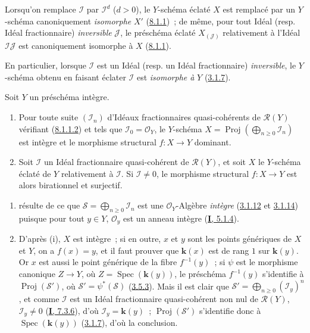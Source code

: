 Lorsqu'on remplace $\mathcal{I}$ par $\mathcal{I}^d$ ($d>0$), le $Y$-schéma
éclaté $X$ est remplacé par un $Y$-schéma canoniquement \emph{isomorphe} $X'$
(\hyperref[II.8.1.1-fr]{8.1.1})~; de même, pour tout Idéal (resp. Idéal
fractionnaire) \emph{inversible} $\mathcal{J}$, le préschéma éclaté
$X_{(\mathcal{J})}$ relativement à l'Idéal $\mathcal{I}\mathcal{J}$ est
canoniquement isomorphe à $X$ (\hyperref[II.8.1.1-fr]{8.1.1}).

En particulier, lorsque $\mathcal{I}$ est un Idéal (resp. un Idéal
fractionnaire) \emph{inversible}, le $Y$-schéma obtenu en faisant éclater
$\mathcal{I}$ est \emph{isomorphe à} $Y$ (\hyperref[II.3.1.7-fr]{3.1.7}).

\begin{proposition}[8.1.4]
\label{II.8.1.4-fr}
Soit $Y$ un préschéma intègre.
\begin{enumerate}
\item[\rm(i)] Pour toute suite $(\mathcal{I}_n)$ d'Idéaux fractionnaires
quasi-cohérents de $\mathcal{R}(Y)$ vérifiant
\textup{(\hyperref[II.8.1.1.2-fr]{8.1.1.2})}
et tels que $\mathcal{I}_0=\mathcal{O}_Y$, le $Y$-schéma
$X=\operatorname{Proj}(\bigoplus_{n\geq0}\mathcal{I}_n)$ est intègre et le
morphisme structural $f:X\to Y$ dominant.
\item[\rm(ii)] Soit $\mathcal{I}$ un Idéal fractionnaire quasi-cohérent de
$\mathcal{R}(Y)$, et soit $X$ le $Y$-schéma éclaté de $Y$ relativement à
$\mathcal{I}$. Si $\mathcal{I}\neq0$, le morphisme structural $f:X\to Y$ est
alors birationnel et surjectif.
\end{enumerate}
\end{proposition}

\begin{enumerate}
\item[\rm(i)] résulte de ce que $\mathcal{S}=\bigoplus_{n\geq0}\mathcal{I}_n$
est une $\mathcal{O}_Y$-Algèbre \emph{intègre}
(\hyperref[II.3.1.12-fr]{3.1.12} et \hyperref[II.3.1.14-fr]{3.1.14}) puisque
pour tout $y\in Y$, $\mathcal{O}_y$ est un anneau intègre
(\hyperref[I.5.1.4-fr]{\textbf{I}, 5.1.4}).
\item[\rm(ii)] D'après (i), $X$ est intègre~; si en outre, $x$ et $y$ sont les
points génériques de $X$ et $Y$, on a $f(x)=y$, et il faut prouver que $\boldsymbol{k}(x)$
est de rang $1$ sur $\boldsymbol{k}(y)$. Or $x$ est aussi le point générique de la fibre
$f^{-1}(y)$~; si $\psi$ est le morphisme canonique $Z\to Y$, où
$Z=\operatorname{Spec}(\boldsymbol{k}(y))$, le préschéma $f^{-1}(y)$ s'identifie à
$\operatorname{Proj}(\mathcal{S}')$, où
$\mathcal{S}'=\psi^*(\mathcal{S})$ (\hyperref[II.3.5.3-fr]{3.5.3}). Mais il est
clair que $\mathcal{S}'=\bigoplus_{n\geq0}(\mathcal{I}_y)^n$, et comme
$\mathcal{I}$ est un Idéal fractionnaire quasi-cohérent non nul de
$\mathcal{R}(Y)$, $\mathcal{I}_y\neq0$
(\hyperref[I.7.3.6-fr]{\textbf{I}, 7.3.6}), d'où $\mathcal{I}_y=\boldsymbol{k}(y)$~;
$\operatorname{Proj}(\mathcal{S}')$ s'identifie donc à
$\operatorname{Spec}(\boldsymbol{k}(y))$ (\hyperref[II.3.1.7-fr]{3.1.7}), d'où la
conclusion.
\end{enumerate}

